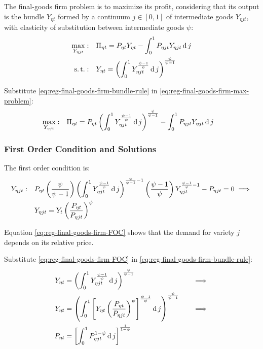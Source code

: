 \documentclass[../thesis.tex]{subfiles}
\begin{document}
The final-goods firm problem is to maximize its profit, considering that its output is the bundle $Y_{\eta t}$ formed by a continuum $j \in [0,1]$ of intermediate goods $Y_{\eta jt}$, with elasticity of substitution between intermediate goods $\psi$:
\begin{align}
	\max_{Y_{\eta jt}}: &\quad \Pi_{\eta t} = P_{\eta t} Y_{\eta t} - \int_{0}^{1} P_{\eta jt} Y_{\eta jt} \operatorname{d} j \label{eq:reg-final-goods-firm-max-problem} \\
	\operatorname{s.t.}: & \quad Y_{\eta t} = \left( \int_{0}^{1} Y_{\eta jt}^{\frac{\psi-1}{\psi}} \operatorname{d} j \right)^{\frac{\psi}{\psi-1}} \label{eq:reg-final-goods-firm-bundle-rule}
\end{align}

Substitute \ref{eq:reg-final-goods-firm-bundle-rule} in \ref{eq:reg-final-goods-firm-max-problem}:
\begin{align}
	\label{eq:reg-final-goods-firm-max-problem-2}
	\max_{Y_{\eta jt}}: & \quad \Pi_{\eta t} = P_{\eta t} \left( \int_{0}^{1} Y_{\eta jt}^{\frac{\psi-1}{\psi}} \operatorname{d} j \right)^{\frac{\psi}{\psi-1}} - \int_{0}^{1} P_{\eta jt} Y_{\eta jt} \operatorname{d} j
\end{align}

\subsubsection*{First Order Condition and Solutions}

The first order condition is:
\begin{align}
	Y_{\eta jt}:\quad & P_{\eta t} \left( \frac{\psi}{\psi-1} \right) \left( \int_{0}^{1} Y_{\eta jt}^{\frac{\psi-1}{\psi}} \operatorname{d} j \right)^{\frac{\psi}{\psi-1}-1} \left( \frac{\psi-1}{\psi} \right) Y_{\eta jt}^{\frac{\psi-1}{\psi}-1} - P_{\eta jt} = 0 \implies \nonumber \\
	\label{eq:reg-final-goods-firm-FOC}
	& Y_{\eta jt} = Y_{t} \left( \frac{P_{\eta t}}{P_{\eta jt}} \right)^{\psi}
\end{align}

Equation \ref{eq:reg-final-goods-firm-FOC} shows that the demand for variety $j$ depends on its relative price. 

Substitute \ref{eq:reg-final-goods-firm-FOC} in \ref{eq:reg-final-goods-firm-bundle-rule}:
\begin{alignat}{2}
	Y_{\eta t} & = \left( \int_{0}^{1} Y_{\eta jt}^{\frac{\psi-1}{\psi}} \operatorname{d} j \right)^{\frac{\psi}{\psi-1}} &\implies \nonumber \\
	Y_{\eta t} & = \left( \int_{0}^{1} \left[ Y_{\eta t} \left( \frac{P_{\eta t}}{P_{\eta jt}} \right)^{\psi} \right]^{\frac{\psi-1}{\psi}} \operatorname{d} j \right)^{\frac{\psi}{\psi-1}} \quad &\implies \nonumber \\
	P_{\eta t} & = \left[ \int_{0}^{1} P_{\eta jt}^{1-\psi} \operatorname{d} j \right]^{\frac{1}{1-\psi}} \label{eq:reg-final-goods-firm-markup}
\end{alignat}
\end{document}
